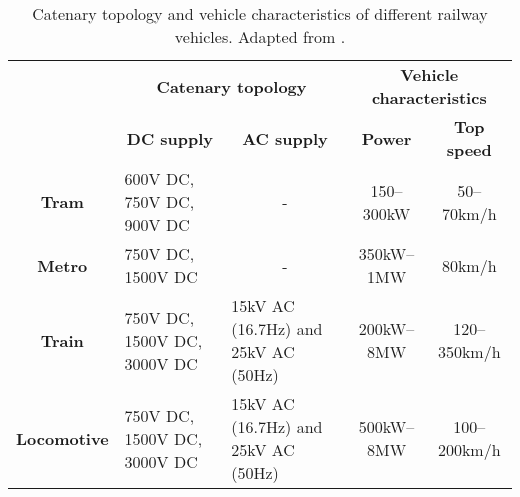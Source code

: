 \begin{table}[htbp]
	\centering
	\footnotesize
	\caption{Catenary topology and vehicle characteristics of different railway vehicles.  Adapted from \cite{abad2016}.}
	\begin{tabular}{|c|p{10.145em}p{10.355em}|cc|}
		\cmidrule{2-5}    \multicolumn{1}{c|}{} & \multicolumn{2}{c|}{\textbf{Catenary topology}} & \multicolumn{2}{c|}{\textbf{Vehicle characteristics}} \\
		\cmidrule{2-5}    \multicolumn{1}{c|}{} & \multicolumn{1}{c}{\textbf{DC supply}} & \multicolumn{1}{c|}{\textbf{AC supply}} & \textbf{Power} & \textbf{Top speed} \\
		\midrule
		\textbf{Tram} & 600V DC, 750V DC, 900V DC & \multicolumn{1}{c|}{-}     & 150–300kW & 50–70km/h \\
		\midrule
		\textbf{Metro} & 750V DC, 1500V DC & \multicolumn{1}{c|}{-}     & 350kW–1MW & 80km/h \\
		\midrule
		\textbf{Train} & 750V DC, 1500V DC, 3000V DC & 15kV AC (16.7Hz) and 25kV AC (50Hz) & 200kW–8MW & 120–350km/h \\
		\midrule
		\textbf{Locomotive} & 750V DC, 1500V DC, 3000V DC & 15kV AC (16.7Hz) and 25kV AC (50Hz) & 500kW–8MW & 100–200km/h \\
		\bottomrule
	\end{tabular}%
	\label{tab:31.t1}%
\end{table}%
